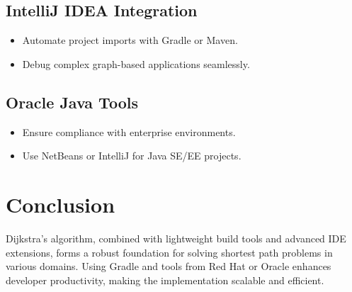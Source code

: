 \documentclass{article}
\begin{document}
\subsection{IntelliJ IDEA Integration}

\begin{itemize}
    \item Automate project imports with Gradle or Maven.
    \item Debug complex graph-based applications seamlessly.
\end{itemize}

\subsection{Oracle Java Tools}

\begin{itemize}
    \item Ensure compliance with enterprise environments.
    \item Use NetBeans or IntelliJ for Java SE/EE projects.
\end{itemize}

\section{Conclusion}

Dijkstra’s algorithm, combined with lightweight build tools and advanced IDE extensions, forms a robust foundation for solving shortest path problems in various domains. Using Gradle and tools from Red Hat or Oracle enhances developer productivity, making the implementation scalable and efficient.
\end{document}
